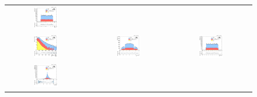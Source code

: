 \begin{figure}[ht]
\begin{center}
\begin{tabular}{ccc}
      \includegraphics[width=0.32\textwidth]{figures/Zprime/2017/complementary/h_led_phi.png}\\
      \includegraphics[width=0.32\textwidth]{figures/Zprime/2017/complementary/h_sub_Et.png}&
      \includegraphics[width=0.32\textwidth]{figures/Zprime/2017/complementary/h_sub_eta.png}&
      \includegraphics[width=0.32\textwidth]{figures/Zprime/2017/complementary/h_sub_phi.png}\\
      \includegraphics[width=0.32\textwidth]{figures/Zprime/2017/complementary/h_DR_ll.png}&

\end{tabular}
\end{center}
\end{figure}
